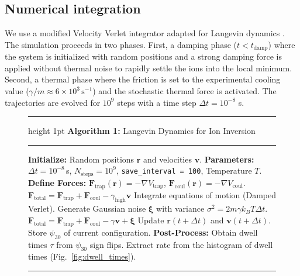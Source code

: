 \documentclass[aps,prl,twocolumn,superscriptaddress,showpacs,floatfix]{revtex4-2}
\begin{document}
\subsection{Numerical integration}
We use a modified Velocity Verlet integrator adapted for Langevin dynamics \cite{Jensen_2013}. The simulation proceeds in two phases. First, a damping phase ($t < t_{\text{damp}}$) where the system is initialized with random positions and a strong damping force is applied without thermal noise to rapidly settle the ions into the local minimum. Second, a thermal phase where the friction is set to the experimental cooling value ($\gamma / m \approx 6 \times 10^3 \, \text{s}^{-1}$) and the stochastic thermal force is activated. The trajectories are evolved for $10^9$ steps with a time step $\Delta t = 10^{-8}$ s.

\begin{figure}[h]
\centering
\begin{minipage}{0.95\linewidth}
    \hrule height 1pt \vspace{3pt}
    \textbf{Algorithm 1:} Langevin Dynamics for Ion Inversion
    \vspace{3pt} \hrule \vspace{5pt}

    \begin{algorithmic}[1]
        \State \textbf{Initialize:} Random positions $\mathbf{r}$ and velocities $\mathbf{v}$.
        \State \textbf{Parameters:} $\Delta t = 10^{-8}$\,s, $N_{\text{steps}} = 10^9$, \texttt{save\_interval = 100}, Temperature $T$.
        \State \textbf{Define Forces:} $\mathbf{F}_{\text{trap}}(\mathbf{r}) = - \nabla V_{\text{trap}}$, $\mathbf{F}_{\text{coul}}(\mathbf{r}) = - \nabla V_{\text{coul}}$.
        \State
             
                \State $\mathbf{F}_{\text{total}} = \mathbf{F}_{\text{trap}} + \mathbf{F}_{\text{coul}} - \gamma_{\text{high}} \mathbf{v}$
                \State Integrate equations of motion (Damped Verlet).
            \Else {}
                \State Generate Gaussian noise $\boldsymbol{\xi}$ with variance $\sigma^2 = 2 m \gamma k_B T \Delta t$.
                \State $\mathbf{F}_{\text{total}} = \mathbf{F}_{\text{trap}} + \mathbf{F}_{\text{coul}} - \gamma \mathbf{v} + \boldsymbol{\xi}$
                \State Update $\mathbf{r}(t+\Delta t)$ and $\mathbf{v}(t+\Delta t)$.
            \EndIf
            \State
                \State Store $\psi_{30}$ of current configuration.
            \EndIf
        \EndFor
        \State \textbf{Post-Process:} Obtain dwell times $\tau$ from $\psi_{30}$ sign flips. Extract rate from the histogram of dwell times (Fig.~\ref{fig:dwell_times}).
    \end{algorithmic}

    \vspace{5pt} \hrule
\end{minipage}
\label{alg:langevin}
\end{figure}
\end{document}
